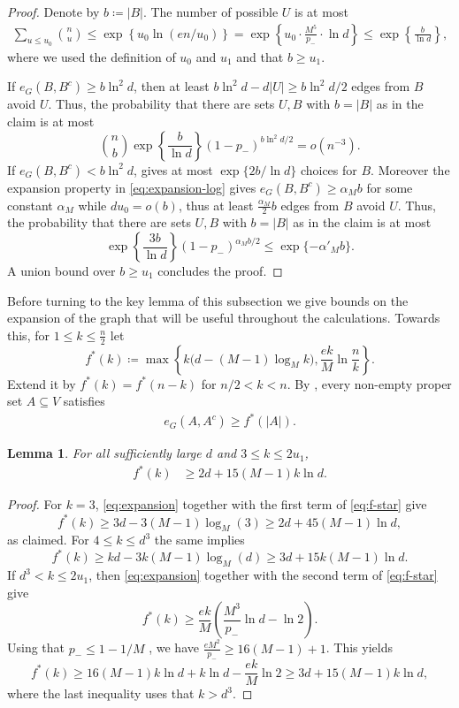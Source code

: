 \documentclass[notitlepage]{scrartcl}
\newtheorem{lemma}[thm]{Lemma}
\begin{document}
\begin{proof}
Denote by $b \coloneqq |B|$. The number of possible $U$ is at most
\begin{align*}
    \sum_{u\le u_0}\binom nu \le\exp\left\{u_0\ln(en/u_0)\right\}=\exp\left\{u_0\cdot \frac{M^5}{p_-}\cdot \ln d \right\}\le \exp\left\{\frac{b}{\ln d}\right\},
\end{align*}
where we used the definition of $u_0$ and $u_1$ and that $b\ge u_1$.

If $e_G(B,B^c)\ge b\ln^2 d$, then at least $b\ln^2d-d|U|\ge b\ln^2 d/2$ edges from $B$ avoid $U$. Thus, the probability that there are sets $ U, B$ with $b=|B|$ as in the claim is at most
\[
 \binom nb\exp\left\{\frac{b}{\ln d}\right\}(1-p_-)^{b\ln^2 d/2}=o(n^{-3}).
\]
If $e_G(B,B^c)<b\ln^2 d$,  gives at most $\exp\{2b/\ln d\}$ choices for $B$.
Moreover the expansion property in \eqref{eq:expansion-log} gives $e_G(B,B^c)\ge \alpha_M b$ for some constant $\alpha_M$ while $du_0=o(b)$, thus at least $\frac{\alpha_M}{2} b$ edges from $B$ avoid $U$. Thus, the probability that there are sets $ U, B$ with $b=|B|$ as in the claim is at most
\[
 \exp\left\{\frac{3b}{\ln d}\right\}(1-p_-)^{\alpha_M b/2}\le\exp\{-\alpha'_M b\}.
\]
A union bound over $b \geq u_1$ concludes the proof.
\end{proof}

Before turning to the key lemma of this subsection we give bounds on the expansion of the graph that will be useful throughout the calculations.
Towards this, for $1 \leq k \leq \frac{n}{2}$ let
\begin{equation*}\label{eq:f-star}
 f^*(k)\coloneqq \max\left\{k\bigl(d-(M-1)\log_Mk\bigr),
             \frac{ek}{M}\ln\frac nk\right\}.
\end{equation*}
Extend it by $f^*(k)=f^*(n-k)$ for $n/2<k<n$.
By , every non-empty proper set $A\subseteq V$ satisfies
\begin{align} \label{eq:expansion}
    e_G(A,A^c)\ge f^*(|A|).
\end{align}

\begin{lemma}\label{lem:strong-boundary}
For all sufficiently large $d$ and $3\le k\le2u_1$,
\begin{align}
 f^*(k)&\ge2d+15 (M-1) k \ln d.\label{eq:strong-3d}
\end{align}
\end{lemma}

\begin{proof}
For $k=3$, \eqref{eq:expansion} together with the first term of \eqref{eq:f-star} give
\[
 f^*(k)\ge 3d- 3(M-1) \log_M(3) \geq 2d + 45(M-1) \ln d,
\]
as claimed. For $4 \leq k \le d^3$ the same implies
\[
f^*(k)\ge kd - 3k(M-1) \log_M(d) \geq 3d + 15k (M-1) \ln d.
\]
If $d^3<k\le2u_1$, then \eqref{eq:expansion} together with the second term of \eqref{eq:f-star} give
\[
 f^*(k)\ge\frac{ek}{M}\left(\frac{M^3}{p_-}\ln d-\ln 2\right).
\]
Using that $p_-\le1-1/M$
, we have $\frac{eM^2}{p_-} \geq 16(M-1)+1$. This yields
\[
 f^*(k)\ge 16(M-1) k \ln d + k \ln d - \frac{ek}{M} \ln 2 \geq 3d + 15(M-1)k \ln d,
\]
where the last inequality uses that $k>d^3$.
\end{proof}
\end{document}
